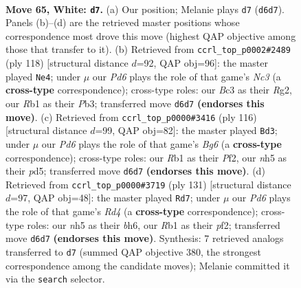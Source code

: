 \documentclass[11pt]{article}
\begin{document}
\clearpage

\begin{figure}[p]\centering
\begin{subfigure}{0.46\textwidth}\centering
\resizebox{\linewidth}{!}{%
\newchessgame
\chessboard[
  setfen={2bq1k2/5p2/3P1n2/6Qn/2p4P/p1B2pP1/P6K/1R6 w - - 10 65},
  showmover=false,
  pgfstyle=straightmove, color=movearrow, markmove={d6-d7}
]}
\caption{}
\end{subfigure}\hfill
\begin{subfigure}{0.46\textwidth}\centering
\resizebox{\linewidth}{!}{%
\newchessgame
\chessboard[
  setfen={7k/7n/1pp1bn1q/p3Q3/P1P4p/1PN5/6RK/8 w - - 0 60},
  showmover=false,
  pgfstyle=straightmove, color=movearrow, markmove={c3-e4}
]}
\caption{}
\end{subfigure}
\\[4pt]
\begin{subfigure}{0.46\textwidth}\centering
\resizebox{\linewidth}{!}{%
\newchessgame
\chessboard[
  setfen={2k5/2p3p1/2Qnq1Bp/3p3P/3P4/5P2/5PK1/8 w - - 19 59},
  showmover=false,
  pgfstyle=straightmove, color=movearrow, markmove={g6-d3}
]}
\caption{}
\end{subfigure}\hfill
\begin{subfigure}{0.46\textwidth}\centering
\resizebox{\linewidth}{!}{%
\newchessgame
\chessboard[
  setfen={8/4QNqk/5ppB/3r1b1p/7P/8/5PPK/8 b - - 8 66},
  showmover=false,
  pgfstyle=straightmove, color=movearrow, markmove={d5-d7}
]}
\caption{}
\end{subfigure}
\caption{\textbf{Move 65, White: \texttt{d7}.} (a) Our position; Melanie plays \texttt{d7} (\texttt{d6d7}). Panels (b)--(d) are the retrieved master positions whose correspondence most drove this move (highest QAP objective among those that transfer to it). (b) Retrieved from \texttt{ccrl\_top\_p0002\#2489} (ply 118) [structural distance $d$=92, QAP obj=96]: the master played \texttt{Ne4}; under $\mu$ our \emph{Pd6} plays the role of that game's \emph{Nc3} (a \textbf{cross-type} correspondence); cross-type roles: our \emph{B}c3 as their \emph{R}g2, our \emph{R}b1 as their \emph{P}b3; transferred move \texttt{d6d7} \textbf{(endorses this move)}. (c) Retrieved from \texttt{ccrl\_top\_p0000\#3416} (ply 116) [structural distance $d$=99, QAP obj=82]: the master played \texttt{Bd3}; under $\mu$ our \emph{Pd6} plays the role of that game's \emph{Bg6} (a \textbf{cross-type} correspondence); cross-type roles: our \emph{R}b1 as their \emph{P}f2, our \emph{n}h5 as their \emph{p}d5; transferred move \texttt{d6d7} \textbf{(endorses this move)}. (d) Retrieved from \texttt{ccrl\_top\_p0000\#3719} (ply 131) [structural distance $d$=97, QAP obj=48]: the master played \texttt{Rd7}; under $\mu$ our \emph{Pd6} plays the role of that game's \emph{Rd4} (a \textbf{cross-type} correspondence); cross-type roles: our \emph{n}h5 as their \emph{b}h6, our \emph{R}b1 as their \emph{p}f2; transferred move \texttt{d6d7} \textbf{(endorses this move)}. Synthesis: 7 retrieved analogs transferred to \texttt{d7} (summed QAP objective 380, the strongest correspondence among the candidate moves); Melanie committed it via the \texttt{search} selector.}
\label{fig:thought-m128}
\end{figure}
\end{document}
